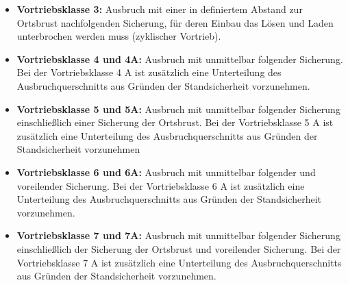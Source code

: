 \documentclass[fleqn,twoside]{article}
\begin{document}
\begin{itemize}
\begin{itemize}
            \item \textbf{Vortriebsklasse 3:} Ausbruch mit einer in definiertem Abstand zur Ortsbrust nachfolgenden Sicherung, für deren Einbau das Lösen und Laden unterbrochen werden muss (zyklischer Vortrieb).
            \item \textbf{Vortriebsklasse 4 und 4A:} Ausbruch mit unmittelbar folgender Sicherung. Bei der Vortriebsklasse 4 A ist zusätzlich eine Unterteilung des Ausbruchquerschnitts aus Gründen der Standsicherheit vorzunehmen.
            \item \textbf{Vortriebsklasse 5 und 5A:} Ausbruch mit unmittelbar folgender Sicherung einschließlich einer Sicherung der Ortsbrust. Bei der Vortriebsklasse 5 A ist zusätzlich eine Unterteilung des Ausbruchquerschnitts aus Gründen der Standsicherheit vorzunehmen
            \item \textbf{Vortriebsklasse 6 und 6A:} Ausbruch mit unmittelbar folgender und voreilender Sicherung. Bei der Vortriebsklasse 6 A ist zusätzlich eine Unterteilung des Ausbruchquerschnitts aus Gründen der Standsicherheit vorzunehmen.
            \item \textbf{Vortriebsklasse 7 und 7A:} Ausbruch mit unmittelbar folgender Sicherung einschließlich der Sicherung der Ortsbrust und voreilender Sicherung. Bei der Vortriebsklasse 7 A ist zusätzlich eine Unterteilung des Ausbruchquerschnitts aus Gründen der Standsicherheit vorzunehmen.
        \end{itemize}
\end{itemize}
\end{document}
